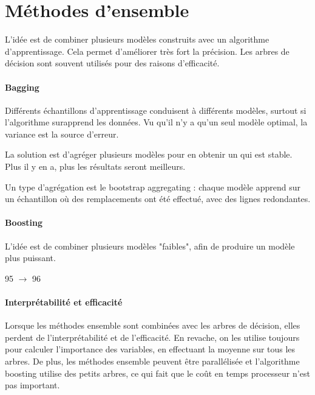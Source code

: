 \chapter{Méthodes d'ensemble}

L'idée est de combiner plusieurs modèles construits avec un algorithme d'apprentissage. Cela permet d'améliorer très fort la précision. Les arbres de décision sont souvent utilisés pour des raisons d'efficacité.

	\subsubsection{Bagging}
	
	Différents échantillons d'apprentissage conduisent à différents modèles, surtout si l'algorithme surapprend les données. Vu qu'il n'y a qu'un seul modèle optimal, la variance est la source d'erreur.
	
	La solution est d'agréger plusieurs modèles pour en obtenir un qui est stable. Plus il y en a, plus les résultats seront meilleurs.
	
	
	Un type d'agrégation est le bootstrap aggregating : chaque modèle apprend sur un échantillon où des remplacements ont été effectué, avec des lignes redondantes.
	
	
	
	\subsubsection{Boosting}
	
	L'idée est de combiner plusieurs modèles "faibles", afin de produire un modèle plus puissant.
	
	95 $\rightarrow$ 96
	
	\subsubsection{Interprétabilité et efficacité}
	
	Lorsque les méthodes ensemble sont combinées avec les arbres de décision, elles perdent de l'interprétabilité et de l'efficacité. En revache, on les utilise toujours pour calculer l'importance des variables, en effectuant la moyenne sur tous les arbres. De plus, les méthodes ensemble peuvent être parallélisée et l'algorithme boosting utilise des petits arbres, ce qui fait que le coût en temps processeur n'est pas important.
	
	
	
